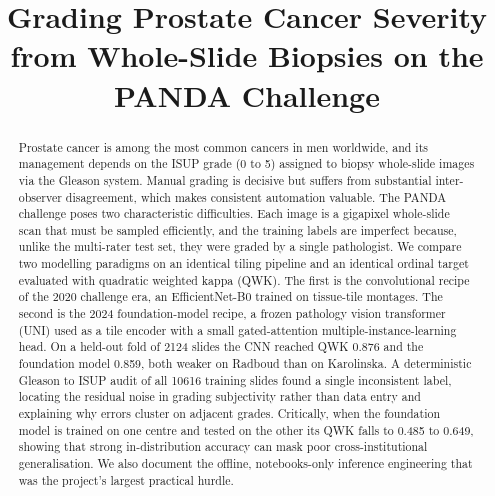 \documentclass[conference]{IEEEtran}
\begin{document}
\title{Grading Prostate Cancer Severity from Whole-Slide Biopsies on the PANDA Challenge}

\author{
\and
{}
\and
{}
}

\maketitle

\begin{abstract}
Prostate cancer is among the most common cancers in men worldwide, and its
management depends on the ISUP grade (0 to 5) assigned to biopsy whole-slide
images via the Gleason system. Manual grading is decisive but suffers from
substantial inter-observer disagreement, which makes consistent automation
valuable. The PANDA challenge poses two characteristic difficulties. Each image
is a gigapixel whole-slide scan that must be sampled efficiently, and the
training labels are imperfect because, unlike the multi-rater test set, they were
graded by a single pathologist. We compare two modelling paradigms on an
identical tiling pipeline and an identical ordinal target evaluated with
quadratic weighted kappa (QWK). The first is the convolutional recipe of the 2020
challenge era, an EfficientNet-B0 trained on tissue-tile montages. The second is
the 2024 foundation-model recipe, a frozen pathology vision transformer (UNI)
used as a tile encoder with a small gated-attention multiple-instance-learning
head. On a held-out fold of 2124 slides the CNN reached QWK 0.876 and the
foundation model 0.859, both weaker on Radboud than on Karolinska. A
deterministic Gleason to ISUP audit of all 10616 training slides found a single
inconsistent label, locating the residual noise in grading subjectivity rather
than data entry and explaining why errors cluster on adjacent grades. Critically,
when the foundation model is trained on one centre and tested on the other its QWK
falls to 0.485 to 0.649, showing that strong in-distribution accuracy can mask poor
cross-institutional generalisation. We also document the offline, notebooks-only
inference engineering that was the project's largest practical hurdle.
\end{abstract}
\end{document}
